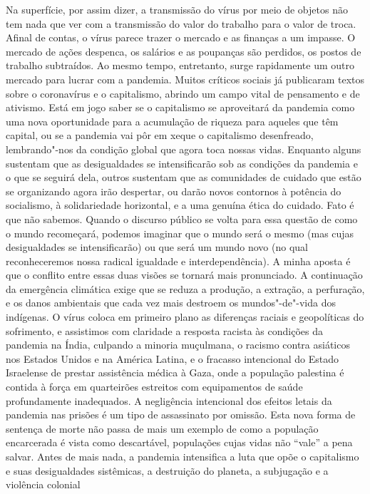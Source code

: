 Na superfície, por assim dizer, a transmissão do vírus por meio de
objetos não tem nada que ver com a transmissão do valor do trabalho para
o valor de troca. Afinal de contas, o vírus parece trazer o mercado e as
finanças a um impasse. O mercado de ações despenca, os salários e as
poupanças são perdidos, os postos de trabalho subtraídos. Ao mesmo
tempo, entretanto, surge rapidamente um outro mercado para lucrar com a
pandemia. Muitos críticos sociais já publicaram textos sobre o
coronavírus e o capitalismo, abrindo um campo vital de pensamento e de
ativismo. Está em jogo saber se o capitalismo se aproveitará da pandemia
como uma nova oportunidade para a acumulação de riqueza para aqueles que
têm capital, ou se a pandemia vai pôr em xeque o capitalismo
desenfreado, lembrando"-nos da condição global que agora toca nossas
vidas. Enquanto alguns sustentam que as desigualdades se intensificarão
sob as condições da pandemia e o que se seguirá dela, outros sustentam
que as comunidades de cuidado que estão se organizando agora irão
despertar, ou darão novos contornos à potência do socialismo, à
solidariedade horizontal, e a uma genuína ética do cuidado. Fato é que
não sabemos. Quando o discurso público se volta para essa questão de
como o mundo recomeçará, podemos imaginar que o mundo será o mesmo (mas
cujas desigualdades se intensificarão) ou que será um mundo novo (no
qual reconheceremos nossa radical igualdade e interdependência). A minha
aposta é que o conflito entre essas duas visões se tornará mais
pronunciado. A continuação da emergência climática exige que se reduza a
produção, a extração, a perfuração, e os danos ambientais que cada vez
mais destroem os mundos"-de"-vida dos indígenas. O vírus coloca em
primeiro plano as diferenças raciais e geopolíticas do sofrimento, e
assistimos com claridade a resposta racista às condições da pandemia na
Índia, culpando a minoria muçulmana, o racismo contra asiáticos nos
Estados Unidos e na América Latina, e o fracasso intencional do Estado
Israelense de prestar assistência médica à Gaza, onde a população
palestina é contida à força em quarteirões estreitos com equipamentos de
saúde profundamente inadequados. A negligência intencional dos efeitos
letais da pandemia nas prisões é um tipo de assassinato por omissão.
Esta nova forma de sentença de morte não passa de mais um exemplo de
como a população encarcerada é vista como descartável, populações cujas
vidas não ``vale'' a pena salvar. Antes de mais nada, a pandemia
intensifica a luta que opõe o capitalismo e suas desigualdades
sistêmicas, a destruição do planeta, a subjugação e a violência colonial
